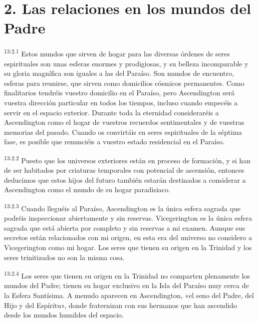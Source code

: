 \section*{2. Las relaciones en los mundos del Padre}
\par
\textsuperscript{13:2.1} Estos mundos que sirven de hogar para las diversas órdenes de seres espirituales son unas esferas enormes y prodigiosas, y su belleza incomparable y su gloria magnífica son iguales a las del Paraíso. Son mundos de encuentro, esferas para reunirse, que sirven como domicilios cósmicos permanentes. Como finalitarios tendréis vuestro domicilio en el Paraíso, pero Ascendington será vuestra dirección particular en todos los tiempos, incluso cuando empecéis a servir en el espacio exterior. Durante toda la eternidad consideraréis a Ascendington como el hogar de vuestros recuerdos sentimentales y de vuestras memorias del pasado. Cuando os convirtáis en seres espirituales de la séptima fase, es posible que renunciéis a vuestro estado residencial en el Paraíso.

\par
\textsuperscript{13:2.2} Puesto que los universos exteriores están en proceso de formación, y si han de ser habitados por criaturas temporales con potencial de ascensión, entonces deducimos que estos hijos del futuro también estarán destinados a considerar a Ascendington como el mundo de su hogar paradisiaco.

\par
\textsuperscript{13:2.3} Cuando lleguéis al Paraíso, Ascendington es la única esfera sagrada que podréis inspeccionar abiertamente y sin reservas. Vicegerington es la única esfera sagrada que está abierta por completo y sin reservas a mi examen. Aunque sus secretos están relacionados con mi origen, en esta era del universo no considero a Vicegerington como mi hogar. Los seres que tienen su origen en la Trinidad y los seres trinitizados no son la misma cosa.

\par
\textsuperscript{13:2.4} Los seres que tienen su origen en la Trinidad no comparten plenamente los mundos del Padre; tienen su hogar exclusivo en la Isla del Paraíso muy cerca de la Esfera Santísima. A menudo aparecen en Ascendington, «el seno del Padre, del Hijo y del Espíritu», donde fraternizan con sus hermanos que han ascendido desde los mundos humildes del espacio.

